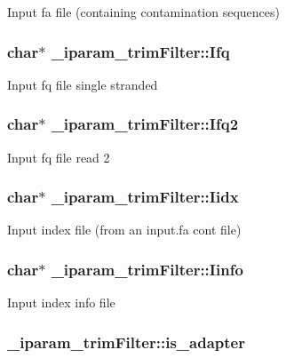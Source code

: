 Input fa file (containing contamination sequences) \hypertarget{struct__iparam__trimFilter_a5147310738277c148ca7109ba77829ca}{
\subsubsection[{Ifq}]{\setlength{\rightskip}{0pt plus 5cm}char$\ast$ \+\_\+iparam\+\_\+trim\+Filter\+::\+Ifq}}\label{struct__iparam__trimFilter_a5147310738277c148ca7109ba77829ca}
Input fq file single stranded \hypertarget{struct__iparam__trimFilter_a5c45337d4d046a995265bd2849ea4785}{
\subsubsection[{Ifq2}]{\setlength{\rightskip}{0pt plus 5cm}char$\ast$ \+\_\+iparam\+\_\+trim\+Filter\+::\+Ifq2}}\label{struct__iparam__trimFilter_a5c45337d4d046a995265bd2849ea4785}
Input fq file read 2 \hypertarget{struct__iparam__trimFilter_a158296e4d37ab3b033c6f9aee1516d71}{
\subsubsection[{Iidx}]{\setlength{\rightskip}{0pt plus 5cm}char$\ast$ \+\_\+iparam\+\_\+trim\+Filter\+::\+Iidx}}\label{struct__iparam__trimFilter_a158296e4d37ab3b033c6f9aee1516d71}
Input index file (from an input.\+fa cont file) \hypertarget{struct__iparam__trimFilter_aa1cf61870d64b1e49778dd72312ad707}{
\subsubsection[{Iinfo}]{\setlength{\rightskip}{0pt plus 5cm}char$\ast$ \+\_\+iparam\+\_\+trim\+Filter\+::\+Iinfo}}\label{struct__iparam__trimFilter_aa1cf61870d64b1e49778dd72312ad707}
Input index info file \hypertarget{struct__iparam__trimFilter_a6d015b5bf1568c362d9ca0ff37b751f8}{
\subsubsection[{is\+\_\+adapter}]{ \+\_\+iparam\+\_\+trim\+Filter\+::is\+\_\+adapter}}\label{struct__iparam__trimFilter_a6d015b5bf1568c362d9ca0ff37b751f8}
